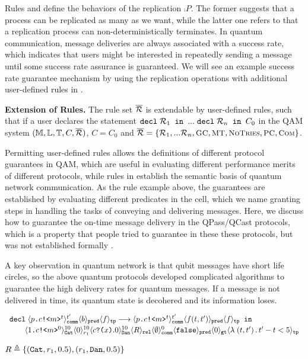 Rules  and  define the behaviors of the replication $\comp{P}$.
The former suggests that a process can be replicated as many as we want, while the latter one refers to that a replication process can non-deterministically terminates.
In quantum communication, message deliveries are always associated with a success rate,
which indicates that users might be interested in repeatedly sending a message until some success rate assurance is guaranteed.
We will see an example success rate guarantee mechanism by using the replication operations with additional user-defined rules in .

\noindent\textbf{Extension of Rules.}
The rule set $\overline{\mathcal{R}}$ is extendable by user-defined rules, 
such that if a user declares the statement $\texttt{decl}\;\mathcal{R}_1\texttt{ in }...\; \texttt{decl}\;\mathcal{R}_n\texttt{ in }C_0$
in the QAM system $(\mathbb{M},\mathbb{L},\mathbb{T},C,\overline{\mathcal{R}})$, $C=C_0$ and $\overline{\mathcal{R}}=\{\mathcal{R}_1,...\mathcal{R}_n,{\small \textsc{GC}},{\small \textsc{MT}},{\small \textsc{NoTries}}, {\small \textsc{PC}},{\small \textsc{Com}}\}$.

Permitting user-defined rules allows the definitions of different protocol guarantees in QAM,
which are useful in evaluating different performance merits of different protocols,
while rules in  establish the semantic basis of quantum network communication.
As the  rule example above, the guarantees are established by evaluating different predicates in the  cell,
which we name granting steps in handling the tasks of conveying and delivering messages.
Here, we discuss how to guarantee the on-time message delivery in the QPass/QCast protocols,
which is a property that people tried to guarantee in these these protocols, but was not established formally \cite{10.1145/3387514.3405853}.

A key observation in quantum network is that qubit messages have short life circles,
so the above quantum protocols developed complicated algorithms to guarantee the high delivery rates for quantum messages.
If a message is not delivered in time, its quantum state is decohered and its information loses.

{\footnotesize
\[
\begin{array}{l}
\texttt{decl}\;\langle p\texttt{.}c\texttt{!<}m\texttt{>}^t \rangle^{t'}_{\texttt{comm}}\langle b \rangle_{\texttt{pred}}\langle f \rangle_{\texttt{tp}} 
     \longrightarrow \langle p\texttt{.}c\texttt{!<}m\texttt{>}^t \rangle^{t'}_{\texttt{comm}}\langle f(t,t') \rangle_{\texttt{pred}}\langle f \rangle_{\texttt{tp}}\texttt{ in }
\\[0.2em]
\qquad
\langle 1\texttt{.}c\texttt{!<}m\texttt{>}^0 \rangle^{10}_{\texttt{Cat}}\langle 0 \rangle^{10}_{r_1}
\langle c\texttt{?(}x\texttt{)}.0 \rangle^{10}_{\texttt{Dan}} 
\langle R \rangle_{\texttt{rel}}
\langle \emptyset \rangle^{0}_{\texttt{comm}}
\langle \texttt{false} \rangle_{\texttt{pred}}
\langle 0 \rangle_{\texttt{gt}}
\langle \lambda\;(t,t')\,.\,t'-t<5 \rangle_{\texttt{tp}}
\end{array}
\]
}
{\footnotesize
\begin{center}
$R\triangleq\{(\texttt{Cat},r_1,0.5), (r_1,\texttt{Dan},0.5)\}$
\end{center}
}

